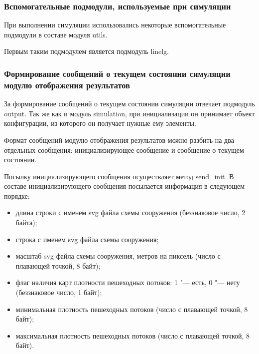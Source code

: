 \subsubsection{Вспомогательные подмодули, используемые при симуляции}
\label{sec:development:core:utils}

При выполнении симуляции использовались некоторые вспомогательные подмодули в составе модуля utils.

Первым таким подмодулем является подмодуль linelg.

\subsubsection{Формирование сообщений о текущем состоянии симуляции модулю отображения результатов}
\label{sec:development:core:output}

За формирование сообщений о текущем состоянии симуляции отвечает подмодуль output.
Так же как и модуль simulation, при инициализации он принимает объект конфигурации, из которого он получает нужные ему элементы.

Формат сообщений модулю отображения результатов можно разбить на два отдельных сообщения: инициализирующее сообщение и сообщение о текущем состоянии.

Посылку инициализирующего сообщения осуществляет метод se\-nd\_in\-it.
В составе инициализирующего сообщения посылается информация в следующем порядке:
\begin{itemize}
  \item длина строки с именем svg файла схемы сооружения (беззнаковое число, 2 байта);
  \item строка с именем svg файла схемы сооружения;
  \item масштаб svg файла схемы сооружения, метров на пиксель (число с плавающей точкой, 8 байт);
  \item флаг наличия карт плотности пешеходных потоков: 1 "--- есть, 0 "--- нету (беззнаковое число, 1 байт);
  \item минимальная плотность пешеходных потоков (число с плавающей точкой, 8 байт);
  \item максимальная плотность пешеходных потоков (число с плавающей точкой, 8 байт).
\end{itemize}

